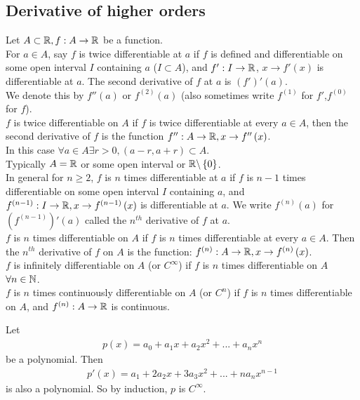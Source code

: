 \documentclass[a4paper]{article}
\begin{document}
\subsection{Derivative of higher orders}
\begin{defi}
Let $A\subset \mathbb{R}, f:A\to\mathbb{R}$ be a function.\\
For $a\in A$, say $f$ is twice differentiable at $a$ if $f$ is defined and differentiable on some open interval $I$ containing $a$ ($I\subset A$), and $f':I\to \mathbb{R}$, $x\to f'\left(x\right)$ is differentiable at $a$.
The second derivative of $f$ at $a$ is $\left(f'\right)'\left(a\right)$.\\
We denote this by $f''\left(a\right)$ or $f^{\left(2\right)} \left(a\right)$ (also sometimes write $f^{\left(1\right)}$ for $f'$,$f^{\left(0\right)}$ for $f$).\\
$f$ is twice differentiable on $A$ if $f$ is twice differentiable at every $a\in A$, then the second derivative of $f$ is the function $f'':A\to \mathbb{R}, x\to f''\left(x\right)$.\\
In this case $\forall a\in A \exists r>0, \left(a-r,a+r\right)\subset A$.\\
Typically $A=\mathbb{R}$ or some open interval or $\mathbb{R} \backslash \left\{0\right\}$.\\

In general for $n\geq 2$, $f$ is $n$ times differentiable at $a$ if $f$ is $n-1$ times differentiable on some open interval $I$ containing $a$, and $f^{\left(n-1\right)}:I\to \mathbb{R}, x \to f^{\left(n-1\right)} \left(x\right)$ is differentiable at $a$. We write $f^{\left(n\right)}\left(a\right)$ for $\left(f^{\left(n-1\right)}\right)'\left(a\right)$ called the $n^{th}$ derivative of $f$ at $a$.\\
$f$ is $n$ times differentiable on $A$ if $f$ is $n$ times differentiable at every $a\in A$. Then the $n^{th}$ derivative of $f$ on $A$ is the function: $f^{\left(n\right)}:A \to \mathbb{R}, x \to f^{\left(n\right)}\left(x\right)$.\\
$f$ is infinitely differentiable on $A$ (or $C^\infty$) if $f$ is $n$ times differentiable on $A$ $\forall n\in \mathbb{N}$.\\
$f$ is $n$ times continuously differentiable on $A$ (or $C^n$) if $f$ is $n$ times differentiable on $A$, and $f^{\left(n\right)}: A\to\mathbb{R}$ is continuous.
\end{defi}

\begin{eg}
Let
\begin{equation*}
\begin{aligned}
p\left(x\right) = a_0 + a_1 x + a_2 x^2 + ... + a_n x^n 
\end{aligned}
\end{equation*}
be a polynomial. Then
\begin{equation*}
\begin{aligned}
p'\left(x\right)=a_1 + 2a_2 x + 3a_3 x^2 + ... + n a_n x^{n-1}
\end{aligned}
\end{equation*}
is also a polynomial. So by induction, $p$ is $C^\infty$.
\end{eg}
\end{document}
